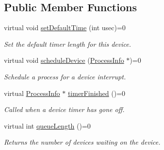 \subsection*{\-Public \-Member \-Functions}
\begin{DoxyCompactItemize}
\item 
virtual void \hyperlink{classcAbsQueuedDevice_a57ab7f649c2c40034212627b78476908}{set\-Default\-Time} (int usec)=0
\begin{DoxyCompactList}\small\item\em \-Set the default timer length for this device. \end{DoxyCompactList}\item 
virtual void \hyperlink{classcAbsQueuedDevice_a529f1c7576d9ec9b87c1d2eb6758c215}{schedule\-Device} (\hyperlink{structProcessInfo}{\-Process\-Info} $\ast$)=0
\begin{DoxyCompactList}\small\item\em \-Schedule a process for a device interrupt. \end{DoxyCompactList}\item 
virtual \hyperlink{structProcessInfo}{\-Process\-Info} $\ast$ \hyperlink{classcAbsQueuedDevice_a98e8fefe9ef8823c854c6769ab1bef55}{timer\-Finished} ()=0
\begin{DoxyCompactList}\small\item\em \-Called when a device timer has gone off. \end{DoxyCompactList}\item 
\hypertarget{classcAbsQueuedDevice_a7b8ef5b9ab48a84342b7da9df9a4bda3}{virtual int \hyperlink{classcAbsQueuedDevice_a7b8ef5b9ab48a84342b7da9df9a4bda3}{queue\-Length} ()=0}\label{d7/d38/classcAbsQueuedDevice_a7b8ef5b9ab48a84342b7da9df9a4bda3}

\begin{DoxyCompactList}\small\item\em \-Returns the number of devices waiting on the device. \end{DoxyCompactList}\end{DoxyCompactItemize}


